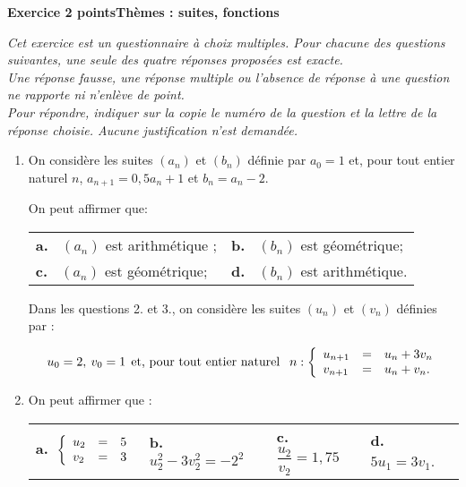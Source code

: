 \documentclass[11pt]{article}
\begin{document}
\bigskip

\textbf{Exercice 2  points\hfill Thèmes : suites, fonctions}

\medskip

\emph{Cet exercice est un questionnaire à choix multiples. Pour chacune des questions suivantes, une seule des quatre réponses proposées est exacte.\\
Une réponse fausse, une réponse multiple ou l'absence de réponse à une question ne rapporte ni n'enlève de point.\\
Pour répondre, indiquer sur la copie le numéro de la question et la lettre de la réponse choisie. Aucune justification n'est demandée.}

\medskip

\begin{enumerate}
\item On considère les suites $\left(a_n\right)$ et $\left(b_n\right)$ définie par $a_0 = 1$ et, pour tout entier naturel $n$,\: $a_{n+1} = 0,5a_n + 1$ et $b_n = a_n - 2$.

On peut affirmer que:

\begin{center}
\begin{tabularx}{\linewidth}{*{2}{X}}
\textbf{a.~} $\left(a_n\right)$ est arithmétique ;&\textbf{b.~} $\left(b_n\right)$ est géométrique;\\
\textbf{c.~} $\left(a_n\right)$ est géométrique;&\textbf{d.~} $\left(b_n\right)$ est arithmétique. 
\end{tabularx}
\end{center}

Dans les questions 2. et 3., on considère les suites $\left(u_n\right)$ et $\left(v_n\right)$ définies par :

\[u_0 = 2,\: v_0 = 1 \:\: \text{et, pour tout entier naturel }\:\:n : \left\{\begin{array}{l c l}
u_{n+1}&=&u_n + 3v_n\\
v_{n+1}&=&u_n + v_n.
\end{array}\right.\]

\item On peut affirmer que :

\begin{center}
\begin{tabularx}{\linewidth}{*{4}{X}}
\textbf{a.~}$\left\{\begin{array}{l c l}
u_2& =& 5\\ v_2 &=& 3
\end{array}\right.$&\textbf{b.~} $u_2^2 - 3v_2^2 = - 2^2$&\textbf{c.~} $\dfrac{u_2}{v_2} = 1,75$&\textbf{d.~} $5u_1 = 3v_1$.\\
\end{tabularx}
\end{center}


\end{enumerate}
\end{document}
